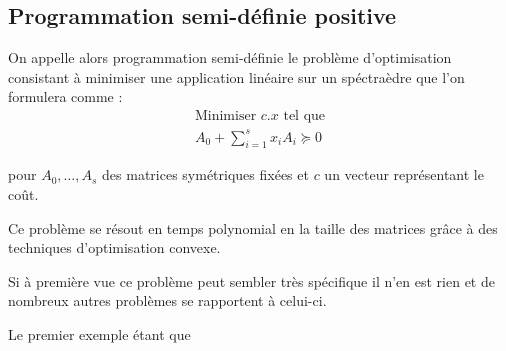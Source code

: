 \subsection{Programmation semi-définie positive}

On appelle alors programmation semi-définie le problème d'optimisation consistant à minimiser une application linéaire sur un spéctraèdre que l'on formulera comme :
\begin{equation}
	\tag{PSD}
	\begin{matrix}
		\text{Minimiser } c.x \text{ tel que}\\
		A_0 + \sum \limits_{i=1}^s x_{i}A_{i} \succeq 0
	\end{matrix}
	\label{Psd} 
\end{equation}

pour $A_0,\ldots, A_s$ des matrices symétriques fixées et $c$ un vecteur représentant le coût.

Ce problème se résout en temps polynomial en la taille des matrices grâce à des techniques d'optimisation convexe. 

Si à première vue ce problème peut sembler très spécifique il n'en est rien et de nombreux autres problèmes se rapportent à celui-ci.

Le premier exemple étant que 
